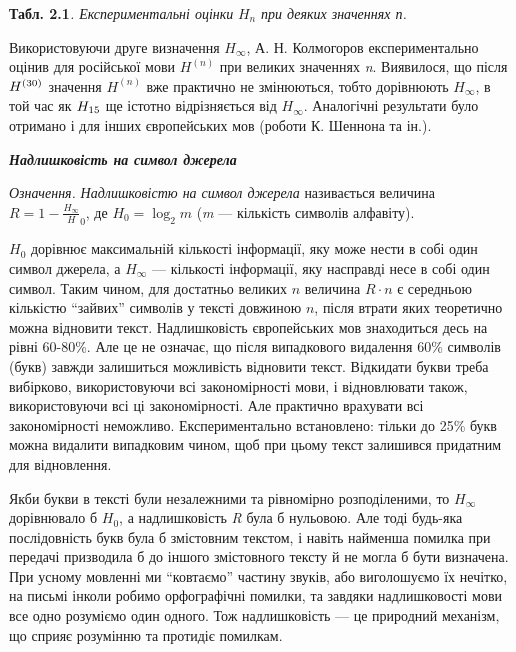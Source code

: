 {\centering
\textbf{Табл. 2.1}\textit{. Експериментальні оцінки } $H_n$ \textit{при
деяких значеннях п.  }
\par}


\bigskip

Використовуючи друге визначення  $H_{\infty }$, А. Н. Колмогоров
експериментально оцінив для російської мови  $H^{(n)}$ при великих
значеннях \textit{n}. Виявилося, що після  $H^{(\text30)}$ значення 
$H^{(n)}$ вже практично не змінюються, тобто дорівнюють  $H_{\infty }$,
в той час як  $H_{\text15}$ ще істотно відрізняється від  ${H_{{\infty
}}}$. Аналогічні результати було отримано  і для інших європейських мов (роботи
К. Шеннона та ін.).


\bigskip


\bigskip

{\centering\bfseries\itshape
Надлишковість на символ джерела
\par}


\bigskip


\bigskip

\textit{Означення.} \textit{Надлишковістю на символ джерела} називається
величина  $R=1-\frac{H_{\infty }}H_0$, де 
$H_{0}=\log _2m$ (\textit{m} --- кількість символів алфавіту).

 $H_0$ дорівнює максимальній кількості інформації, яку може нести в собі
один символ джерела, а  $H_{\infty }$ --- кількості інформації, яку насправді
несе в собі один символ. Таким чином, для достатньо великих  $n$ величина 
$R\cdot n$ є середньою кількістю “зайвих” символів у тексті довжиною  $n$,
після втрати яких теоретично можна відновити текст. Надлишковість європейських
мов знаходиться десь на рівні 60-80\%. Але це не означає, що після випадкового
видалення 60\% символів (букв) завжди залишиться можливість відновити текст.
Відкидати букви треба вибірково, використовуючи всі закономірності мови, і
відновлювати також, використовуючи всі ці закономірності. Але практично
врахувати всі закономірності неможливо. Експериментально встановлено: тільки до
25\% букв можна видалити випадковим чином, щоб при цьому текст залишився
придатним для відновлення.

Якби букви в тексті були незалежними та рівномірно розподіленими, то 
$H_{\infty }$ дорівнювало б  $H_0$, а надлишковість  \textit{R} була
б нульовою. Але тоді будь-яка послідовність букв була б змістовним текстом, і
навіть найменша помилка при передачі  призводила б до іншого змістовного тексту
й не могла б бути визначена. При усному мовленні ми “ковтаємо” частину звуків,
або виголошуємо їх нечітко, на письмі інколи робимо орфографічні помилки, та
завдяки  надлишковості мови все одно розуміємо один одного. Тож надлишковість ---
це природний механізм, що сприяє розумінню та протидіє помилкам.


